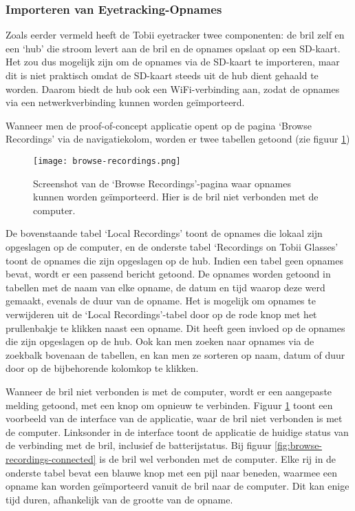 
\subsubsection{Importeren van Eyetracking-Opnames}

Zoals eerder vermeld heeft de Tobii eyetracker twee componenten: de bril zelf en een `hub' die stroom levert aan de bril en de opnames opslaat op een SD-kaart.
Het zou dus mogelijk zijn om de opnames via de SD-kaart te importeren, maar dit is niet praktisch omdat de SD-kaart steeds uit de hub dient gehaald te worden.
Daarom biedt de hub ook een WiFi-verbinding aan, zodat de opnames via een netwerkverbinding kunnen worden geïmporteerd. 

Wanneer men de proof-of-concept applicatie opent op de pagina `Browse Recordings' via de navigatiekolom, worden er twee tabellen getoond (zie figuur \ref{fig:browse-recordings})

\begin{figure}[H]
  \centering
  \texttt{[image: browse-recordings.png]}
  \caption[]{\label{fig:browse-recordings} Screenshot van de `Browse Recordings'-pagina waar opnames kunnen worden geïmporteerd. Hier is de bril niet verbonden met de computer. }
\end{figure}


De bovenstaande tabel `Local Recordings' toont de opnames die lokaal zijn opgeslagen op de computer, en de onderste tabel `Recordings on Tobii Glasses' toont de opnames die zijn opgeslagen op de hub.
Indien een tabel geen opnames bevat, wordt er een passend bericht getoond.
De opnames worden getoond in tabellen met de naam van elke opname, de datum en tijd waarop deze werd gemaakt, evenals de duur van de opname. 
Het is mogelijk om opnames te verwijderen uit de `Local Recordings'-tabel door op de rode knop met het prullenbakje te klikken naast een opname. Dit heeft geen invloed op de opnames die zijn opgeslagen op de hub.
Ook kan men zoeken naar opnames via de zoekbalk bovenaan de tabellen, en kan men ze sorteren op naam, datum of duur door op de bijbehorende kolomkop te klikken.

Wanneer de bril niet verbonden is met de computer, wordt er een aangepaste melding getoond, met een knop om opnieuw te verbinden. Figuur \ref{fig:browse-recordings} toont een voorbeeld van de interface van de applicatie, waar de bril niet verbonden is met de computer.
Linksonder in de interface toont de applicatie de huidige status van de verbinding met de bril, inclusief de batterijstatus. Bij figuur \ref{fig:browse-recordings-connected} is de bril wel verbonden met de computer. 
Elke rij in de onderste tabel bevat een blauwe knop met een pijl naar beneden, waarmee een opname kan worden geïmporteerd vanuit de bril naar de computer. Dit kan enige tijd duren, afhankelijk van de grootte van de opname.

